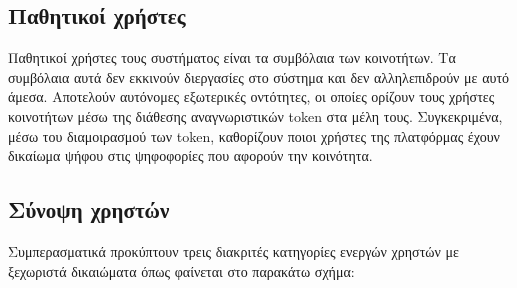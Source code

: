 \subsection{Παθητικοί χρήστες}

Παθητικοί χρήστες τους συστήματος είναι τα συμβόλαια των κοινοτήτων. Τα συμβόλαια αυτά δεν εκκινούν διεργασίες στο σύστημα και δεν αλληλεπιδρούν με αυτό άμεσα. Αποτελούν αυτόνομες εξωτερικές οντότητες, οι οποίες ορίζουν τους χρήστες κοινοτήτων μέσω της διάθεσης αναγνωριστικών token στα μέλη τους. Συγκεκριμένα, μέσω του διαμοιρασμού των token, καθορίζουν ποιοι χρήστες της πλατφόρμας έχουν δικαίωμα ψήφου στις ψηφοφορίες που αφορούν την κοινότητα.

\subsection{Σύνοψη χρηστών}

Συμπερασματικά προκύπτουν τρεις διακριτές κατηγορίες ενεργών χρηστών με ξεχωριστά δικαιώματα όπως φαίνεται στο παρακάτω σχήμα:

